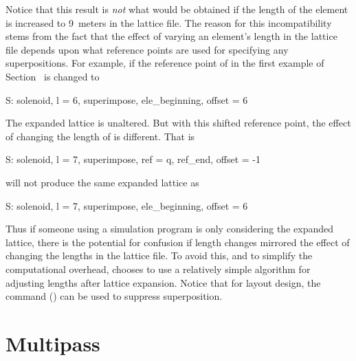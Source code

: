 Notice that this result is {\em not} what would be obtained if the
length of the element  is increased to 9~meters in the lattice
file. The reason for this incompatibility stems from the fact that the
effect of varying an element's length in the lattice file depends upon
what reference points are used for specifying any superpositions. For
example, if the reference point of  in the first example of
Section~ is changed to
\begin{example}
  S: solenoid, l = 6, superimpose, ele_beginning, offset = 6
\end{example}
The expanded lattice is unaltered. But with this shifted reference
point, the effect of changing the length of  is different. That is
\begin{example}
  S: solenoid, l = 7, superimpose, ref = q, ref_end, offset = -1
\end{example}
will not produce the same expanded lattice as
\begin{example}
  S: solenoid, l = 7, superimpose, ele_beginning, offset = 6
\end{example}
Thus if someone using a simulation program is only considering the
expanded lattice, there is the potential for confusion if length
changes mirrored the effect of changing the lengths in the lattice
file.  To avoid this, and to simplify the computational overhead,
\bmad chooses to use a relatively simple algorithm for adjusting
lengths after lattice expansion. Notice that for layout design, the
 command () can be used to
suppress superposition.

\section{Multipass}
\label{s:multipass}

